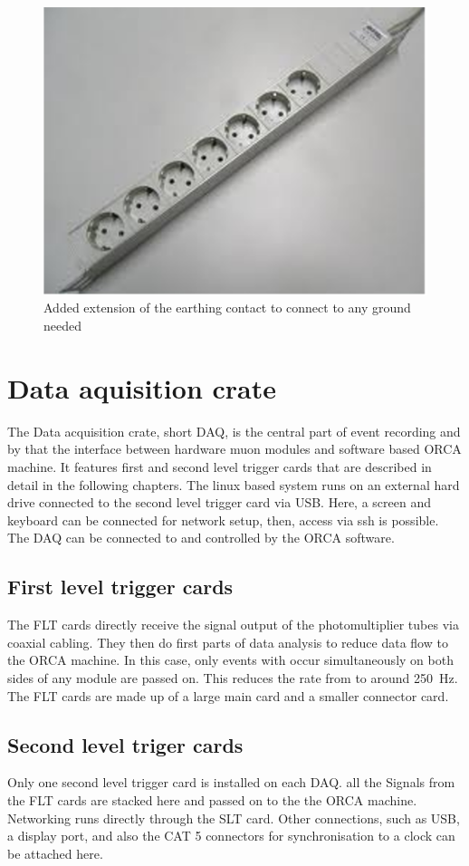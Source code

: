  \begin{figure}
  \centering
  
  	\includegraphics[width = 0.4 \textwidth]{graphics/setup/multiplug.pdf}
  \caption{Added extension of the earthing contact to connect to any ground needed}
  \label{fig:multiplug}
  \end{figure}



\section{Data aquisition crate}
\label{ch:DAQ}
The Data acquisition crate, short DAQ, is the central part of event recording and by that the interface between hardware muon modules and software based ORCA machine. It features first and second level trigger cards that are described in detail in the following chapters. The linux based system runs on an external hard drive connected to the second level trigger card via USB. Here, a screen and keyboard can be connected for network setup, then, access via ssh is possible. The DAQ can be connected to and controlled by the ORCA software.
  \subsection{First level trigger cards}
  \label{ch:DAQ:sec:FLTs}
  The FLT cards directly receive the signal output of the photomultiplier tubes via coaxial cabling. They then do first parts of data analysis to reduce data flow to the ORCA machine. In this case, only events with occur simultaneously on both sides of any module are passed on. This reduces the rate from  to around \SI{250}{\hertz}. The FLT cards are made up of a large main card and a smaller connector card. 
  \subsection{Second level triger cards}
  \label{ch:DAQ:sec:SLTs}
  Only one second level trigger card is installed on each DAQ. all the Signals from the FLT cards are stacked here and passed on to the the ORCA machine. Networking runs directly through the SLT card. Other connections, such as USB, a display port, and also the CAT 5 connectors for synchronisation to a clock can be attached here.

